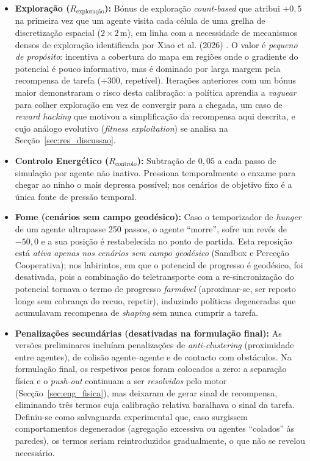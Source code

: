 \documentclass[12pt,reqno, twoside]{amsbook}
\theoremstyle{plain}
\numberwithin{equation}{chapter}
\numberwithin{section}{chapter}
\numberwithin{table}{chapter}
\numberwithin{figure}{chapter}
\begin{document}
\begin{itemize}
    \item \textbf{Exploração ($R_{\text{exploração}}$):} Bónus de exploração \textit{count-based} que atribui $+0{,}5$ na primeira vez que um agente visita cada célula de uma grelha de discretização espacial ($2 \times 2$\,m), em linha com a necessidade de mecanismos densos de exploração identificada por Xiao et al. (2026) \cite{xiao2026csper}. O valor é \emph{pequeno de propósito}: incentiva a cobertura do mapa em regiões onde o gradiente do potencial é pouco informativo, mas é dominado por larga margem pela recompensa de tarefa ($+300$, repetível). Iterações anteriores com um bónus maior demonstraram o risco desta calibração: a política aprendia a \emph{vaguear} para colher exploração em vez de convergir para a chegada, um caso de \textit{reward hacking} que motivou a simplificação da recompensa aqui descrita, e cujo análogo evolutivo (\textit{fitness exploitation}) se analisa na Secção~\ref{sec:res_discussao}.
    \item \textbf{Controlo Energético ($R_{\text{controlo}}$):} Subtração de $0{,}05$ a cada passo de simulação por agente não inativo. Pressiona temporalmente o enxame para chegar ao ninho o mais depressa possível; nos cenários de objetivo fixo é a única fonte de pressão temporal.
    \item \textbf{Fome (cenários sem campo geodésico):} Caso o temporizador de \textit{hunger} de um agente ultrapasse 250 passos, o agente ``morre'', sofre um revés de $-50{,}0$ e a sua posição é restabelecida no ponto de partida. Esta reposição está \emph{ativa apenas nos cenários sem campo geodésico} (Sandbox e Perceção Cooperativa); nos labirintos, em que o potencial de progresso é geodésico, foi desativada, pois a combinação do teletransporte com a re-sincronização do potencial tornava o termo de progresso \textit{farmável} (aproximar-se, ser reposto longe sem cobrança do recuo, repetir), induzindo políticas degeneradas que acumulavam recompensa de \textit{shaping} sem nunca cumprir a tarefa.
    \item \textbf{Penalizações secundárias (desativadas na formulação final):} As versões preliminares incluíam penalizações de \textit{anti-clustering} (proximidade entre agentes), de colisão agente--agente e de contacto com obstáculos. Na formulação final, os respetivos pesos foram colocados a zero: a separação física e o \textit{push-out} continuam a ser \emph{resolvidos} pelo motor (Secção~\ref{sec:eng_fisica}), mas deixaram de gerar sinal de recompensa, eliminando três termos cuja calibração relativa baralhava o sinal da tarefa. Definiu-se como salvaguarda experimental que, caso surgissem comportamentos degenerados (agregação excessiva ou agentes ``colados'' às paredes), os termos seriam reintroduzidos gradualmente, o que não se revelou necessário.
\end{itemize}
\end{document}
